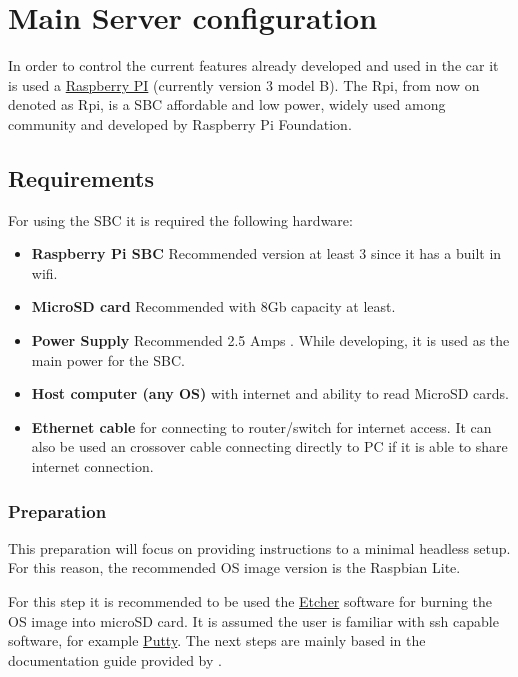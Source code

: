\chapter{Main Server configuration}
\label{chapter:server}

In order to control the current features already developed and used in the car it is used a \href{https://www.raspberrypi.org/products/}{Raspberry PI} (currently version 3 model B). The \acrlong{Rpi}, from now on denoted as \acrshort{Rpi}, is a \gls{SBC} affordable and low power, widely used among community and developed by Raspberry Pi Foundation.

\section{Requirements}
For using the \gls{SBC} it is required the following hardware:
\begin{itemize}
	\item \textbf{Raspberry Pi \gls{SBC}} Recommended version at least 3 since it has a built in wifi.
	\item \textbf{MicroSD card} Recommended with 8Gb capacity at least.
	\item \textbf{Power Supply} Recommended 2.5 Amps . While developing, it is used as the main power for the \gls{SBC}.
	\item \textbf{Host computer (any OS)} with internet and ability to read MicroSD cards.
	\item \textbf{Ethernet cable} for connecting to router/switch for internet access. It can also be used an crossover cable connecting directly to PC if it is able to share internet connection.
\end{itemize}

\subsection{Preparation}
This preparation will focus on providing instructions to a minimal headless setup. For this reason, the recommended OS image version is the Raspbian Lite.

For this step it is recommended to be used the \href{https://etcher.io/}{Etcher} software for burning the OS image into microSD card. It is assumed the user is familiar with ssh capable software, for example \href{https://www.putty.org/}{Putty}.
The next steps are mainly based in the documentation guide provided by \cite{raspberry_install_guide}.


